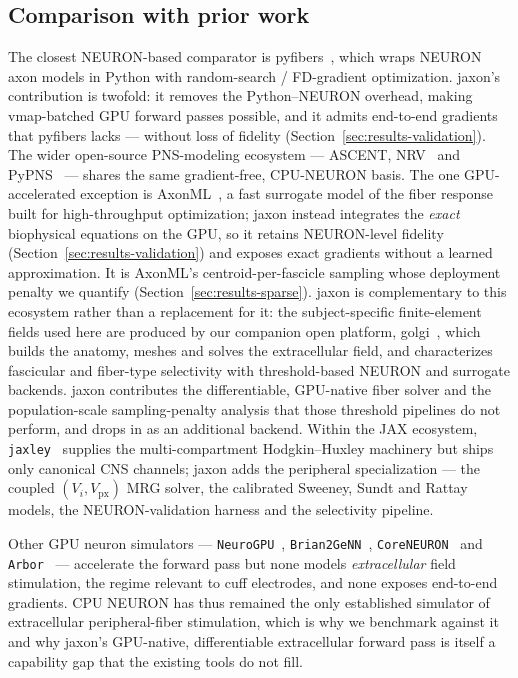 \subsection{Comparison with prior work}

The closest NEURON-based comparator is pyfibers~\cite{marshall2025pyfibers},
which wraps NEURON axon models in Python with random-search / FD-gradient
optimization.  jaxon's contribution is twofold: it removes the
Python--NEURON overhead, making vmap-batched GPU forward passes
possible, and it admits end-to-end gradients that pyfibers lacks ---
without loss of fidelity (Section~\ref{sec:results-validation}).  The
wider open-source PNS-modeling ecosystem --- ASCENT, NRV~\cite{couppey2024nrv}
and PyPNS~\cite{lubba2019pypns} --- shares the same gradient-free,
CPU-NEURON basis.  The one GPU-accelerated exception is
AxonML~\cite{hussain2024axonml}, a fast surrogate model of the fiber
response built for high-throughput optimization; jaxon instead integrates
the \emph{exact} biophysical equations on the GPU, so it retains
NEURON-level fidelity (Section~\ref{sec:results-validation}) and exposes
exact gradients without a learned approximation.  It is AxonML's
centroid-per-fascicle sampling whose deployment penalty we quantify
(Section~\ref{sec:results-sparse}).
jaxon is complementary to this ecosystem rather than a replacement for
it: the subject-specific finite-element fields used here are produced by
our companion open platform, golgi~\cite{lung2026golgi}, which
builds the anatomy, meshes and solves the extracellular field, and
characterizes fascicular and fiber-type selectivity with threshold-based
NEURON and surrogate backends.  jaxon contributes the differentiable,
GPU-native fiber solver and the population-scale sampling-penalty analysis
that those threshold pipelines do not perform, and drops in as an
additional backend.
Within the JAX ecosystem, \texttt{jaxley}~\cite{deistler2024} supplies
the multi-compartment Hodgkin--Huxley machinery but ships only
canonical CNS channels; jaxon adds the peripheral specialization --- the
coupled $(V_i, V_{\mathrm{px}})$ MRG solver, the calibrated Sweeney,
Sundt and Rattay models, the NEURON-validation harness and the
selectivity pipeline.

Other GPU neuron simulators ---
\texttt{NeuroGPU}~\cite{benshalom2022neurogpu},
\texttt{Brian2GeNN}~\cite{stimberg2020brian2genn},
\texttt{CoreNEURON}~\cite{kumbhar2019coreneuron} and
\texttt{Arbor}~\cite{abi2019arbor} ---
accelerate the forward pass but none models \emph{extracellular} field
stimulation, the regime relevant to cuff electrodes, and none exposes
end-to-end gradients.  CPU NEURON has thus remained the only
established simulator of extracellular peripheral-fiber stimulation,
which is why we benchmark against it and why jaxon's GPU-native,
differentiable extracellular forward pass is itself a capability gap
that the existing tools do not fill.

